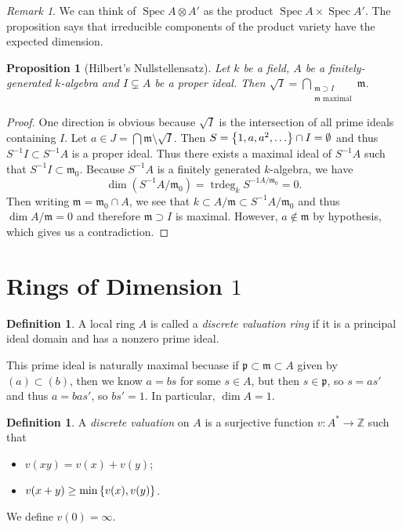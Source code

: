\documentclass[leqno, openany]{memoir}
\newtheorem{prop}[thm]{Proposition}
\theoremstyle{definition}
\newtheorem{defn}[thm]{Definition}
\theoremstyle{remark}
\newtheorem{rmk}[thm]{Remark}
\theoremstyle{plain}
\theoremstyle{definition}
\theoremstyle{remark}
\newcommand{\Z}{\mathbb{Z}}
\newcommand{\mf}[1]{\mathfrak{#1}}
\DeclareMathOperator{\Spec}{Spec}
\begin{document}
\begin{rmk} We can think of $\Spec A \otimes A'$ as the product $\Spec A \times
\Spec A'$. The proposition says that irreducible components of the product
variety have the expected dimension.  \end{rmk}

\begin{prop}[Hilbert's Nullstellensatz] Let $k$ be a field, $A$ be a
finitely-generated $k$-algebra and $I \subsetneq A$ be a proper ideal. Then
$\sqrt{I} = \bigcap_{\substack{\mf{m} \supset I \\ \mf{m} \text{ maximal}}}
\mf{m}$.  \end{prop}

\begin{proof} One direction is obvious because $\sqrt{I}$ is the intersection
    of all prime ideals containing $I$. Let $a \in J = \bigcap \mf{m} \setminus
    \sqrt{I}$. Then $S = \qty{1, a, a^2, \ldots } \cap I = \emptyset$ and thus
    $S^{-1}I \subset S^{-1}A$ is a proper ideal. Thus there exists a maximal
    ideal of $S^{-1}A$ such that $S^{-1}I \subset \mf{m}_0$. Because $S^{-1}A$
    is a finitely generated $k$-algebra, we have \[ \dim (S^{-1}A / \mf{m}_0) =
    \operatorname{trdeg}_k S^{-1A / \mf{m_0}} = 0. \] Then writing $\mf{m} =
    \mf{m}_0 \cap A$, we see that $k \subset A/\mf{m} \subset S^{-1} A /
    \mf{m}_0$ and thus $\dim A / \mf{m} = 0$ and therefore $\mf{m} \supset I$
    is maximal. However, $a \notin \mf{m}$ by hypothesis, which gives us a
    contradiction.  \end{proof}

\section{Rings of Dimension $1$}%

\begin{defn} A local ring $A$ is called a \textit{discrete valuation ring} if
it is a principal ideal domain and has a nonzero prime ideal.  \end{defn}

This prime ideal is naturally maximal becuase if $\mf{p} \subset \mf{m} \subset
A$ given by $(a) \subset (b)$, then we know $a = bs$ for some $s \in A$, but
then $s \in \mf{p}$, so $s = as'$ and thus $a = bas'$, so $bs' = 1$. In
particular, $\dim A = 1$.

\begin{defn} A \textit{discrete valuation} on $A$ is a surjective function $v
\colon A^* \to \Z$ such that \begin{itemize} \item $v(xy) = v(x) + v(y)$; \item
$v(x+y) \geq \min \qty{v(x), v(y)}$.  \end{itemize} We define $v(0) = \infty$.
\end{defn}
\end{document}
